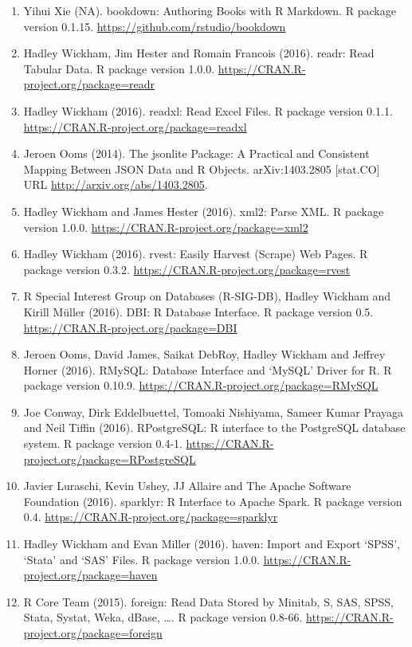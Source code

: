 \documentclass[]{book}
\providecommand{\tightlist}{%
  \setlength{\itemsep}{0pt}\setlength{\parskip}{0pt}}
\begin{document}
\begin{enumerate}
\def\labelenumi{\arabic{enumi}.}
\tightlist
\item
  Yihui Xie (NA). bookdown: Authoring Books with R Markdown. R package
  version 0.1.15. \url{https://github.com/rstudio/bookdown}
\item
  Hadley Wickham, Jim Hester and Romain Francois (2016). readr: Read
  Tabular Data. R package version 1.0.0.
  \url{https://CRAN.R-project.org/package=readr}
\item
  Hadley Wickham (2016). readxl: Read Excel Files. R package version
  0.1.1. \url{https://CRAN.R-project.org/package=readxl}
\item
  Jeroen Ooms (2014). The jsonlite Package: A Practical and Consistent
  Mapping Between JSON Data and R Objects. arXiv:1403.2805 {[}stat.CO{]}
  URL \url{http://arxiv.org/abs/1403.2805}.
\item
  Hadley Wickham and James Hester (2016). xml2: Parse XML. R package
  version 1.0.0. \url{https://CRAN.R-project.org/package=xml2}
\item
  Hadley Wickham (2016). rvest: Easily Harvest (Scrape) Web Pages. R
  package version 0.3.2. \url{https://CRAN.R-project.org/package=rvest}
\item
  R Special Interest Group on Databases (R-SIG-DB), Hadley Wickham and
  Kirill Müller (2016). DBI: R Database Interface. R package version
  0.5. \url{https://CRAN.R-project.org/package=DBI}
\item
  Jeroen Ooms, David James, Saikat DebRoy, Hadley Wickham and Jeffrey
  Horner (2016). RMySQL: Database Interface and `MySQL' Driver for R. R
  package version 0.10.9.
  \url{https://CRAN.R-project.org/package=RMySQL}
\item
  Joe Conway, Dirk Eddelbuettel, Tomoaki Nishiyama, Sameer Kumar Prayaga
  and Neil Tiffin (2016). RPostgreSQL: R interface to the PostgreSQL
  database system. R package version 0.4-1.
  \url{https://CRAN.R-project.org/package=RPostgreSQL}
\item
  Javier Luraschi, Kevin Ushey, JJ Allaire and The Apache Software
  Foundation (2016). sparklyr: R Interface to Apache Spark. R package
  version 0.4. \url{https://CRAN.R-project.org/package=sparklyr}
\item
  Hadley Wickham and Evan Miller (2016). haven: Import and Export
  `SPSS', `Stata' and `SAS' Files. R package version 1.0.0.
  \url{https://CRAN.R-project.org/package=haven}
\item
  R Core Team (2015). foreign: Read Data Stored by Minitab, S, SAS,
  SPSS, Stata, Systat, Weka, dBase, \ldots{}. R package version 0.8-66.
  \url{https://CRAN.R-project.org/package=foreign}
\end{enumerate}
\end{document}
